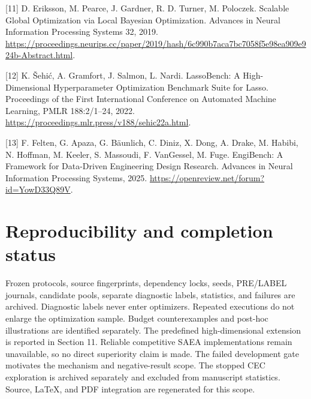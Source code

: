 \documentclass[11pt,a4paper]{article}
\begin{document}
{[}11{]} D. Eriksson, M. Pearce, J. Gardner, R. D. Turner, M. Poloczek.
Scalable Global Optimization via Local Bayesian Optimization. Advances
in Neural Information Processing Systems 32, 2019.
\url{https://proceedings.neurips.cc/paper/2019/hash/6c990b7aca7bc7058f5e98ea909e924b-Abstract.html}.

{[}12{]} K. Šehić, A. Gramfort, J. Salmon, L. Nardi. LassoBench: A
High-Dimensional Hyperparameter Optimization Benchmark Suite for Lasso.
Proceedings of the First International Conference on Automated Machine
Learning, PMLR 188:2/1--24, 2022.
\url{https://proceedings.mlr.press/v188/sehic22a.html}.

{[}13{]} F. Felten, G. Apaza, G. Bäunlich, C. Diniz, X. Dong, A. Drake,
M. Habibi, N. Hoffman, M. Keeler, S. Massoudi, F. VanGessel, M. Fuge.
EngiBench: A Framework for Data-Driven Engineering Design Research.
Advances in Neural Information Processing Systems, 2025.
\url{https://openreview.net/forum?id=YowD33Q89V}.

\hypertarget{reproducibility-and-completion-status}{%
\section{Reproducibility and completion
status}\label{reproducibility-and-completion-status}}

Frozen protocols, source fingerprints, dependency locks, seeds,
PRE/LABEL journals, candidate pools, separate diagnostic labels,
statistics, and failures are archived. Diagnostic labels never enter
optimizers. Repeated executions do not enlarge the optimization sample.
Budget counterexamples and post-hoc illustrations are identified
separately. The predefined high-dimensional extension is reported in
Section 11. Reliable competitive SAEA implementations remain
unavailable, so no direct superiority claim is made. The failed
development gate motivates the mechanism and negative-result scope. The
stopped CEC exploration is archived separately and excluded from
manuscript statistics. Source, LaTeX, and PDF integration are
regenerated for this scope.
\end{document}
